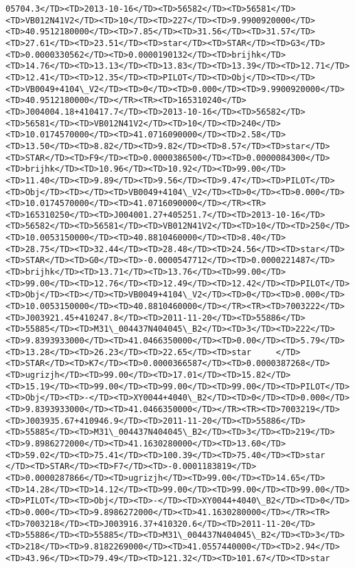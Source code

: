 \documentclass[11pt]{article}
\begin{document}
\begin{Verbatim}[commandchars=\\\{\}]
05704.3</TD><TD>2013-10-16</TD><TD>56582</TD><TD>56581</TD><TD>VB012N41V2</TD><TD>10</TD><TD>227</TD><TD>9.9900920000</TD><TD>40.9512180000</TD><TD>7.85</TD><TD>31.56</TD><TD>31.57</TD><TD>27.61</TD><TD>23.51</TD><TD>star</TD><TD>STAR</TD><TD>G3</TD><TD>0.0000330562</TD><TD>0.0000190132</TD><TD>brijhk</TD><TD>14.76</TD><TD>13.13</TD><TD>13.83</TD><TD>13.39</TD><TD>12.71</TD><TD>12.41</TD><TD>12.35</TD><TD>PILOT</TD><TD>Obj</TD><TD></TD><TD>VB0049+4104\_V2</TD><TD>0</TD><TD>0.000</TD><TD>9.9900920000</TD><TD>40.9512180000</TD></TR><TR><TD>165310240</TD><TD>J004004.18+410417.7</TD><TD>2013-10-16</TD><TD>56582</TD><TD>56581</TD><TD>VB012N41V2</TD><TD>10</TD><TD>240</TD><TD>10.0174570000</TD><TD>41.0716090000</TD><TD>2.58</TD><TD>13.50</TD><TD>8.82</TD><TD>9.82</TD><TD>8.57</TD><TD>star</TD><TD>STAR</TD><TD>F9</TD><TD>0.0000386500</TD><TD>0.0000084300</TD><TD>brijhk</TD><TD>10.96</TD><TD>10.92</TD><TD>99.00</TD><TD>11.40</TD><TD>9.89</TD><TD>9.56</TD><TD>9.47</TD><TD>PILOT</TD><TD>Obj</TD><TD></TD><TD>VB0049+4104\_V2</TD><TD>0</TD><TD>0.000</TD><TD>10.0174570000</TD><TD>41.0716090000</TD></TR><TR><TD>165310250</TD><TD>J004001.27+405251.7</TD><TD>2013-10-16</TD><TD>56582</TD><TD>56581</TD><TD>VB012N41V2</TD><TD>10</TD><TD>250</TD><TD>10.0053150000</TD><TD>40.8810460000</TD><TD>8.40</TD><TD>28.75</TD><TD>32.44</TD><TD>28.48</TD><TD>24.56</TD><TD>star</TD><TD>STAR</TD><TD>G0</TD><TD>-0.0000547712</TD><TD>0.0000221487</TD><TD>brijhk</TD><TD>13.71</TD><TD>13.76</TD><TD>99.00</TD><TD>99.00</TD><TD>12.76</TD><TD>12.49</TD><TD>12.42</TD><TD>PILOT</TD><TD>Obj</TD><TD></TD><TD>VB0049+4104\_V2</TD><TD>0</TD><TD>0.000</TD><TD>10.0053150000</TD><TD>40.8810460000</TD></TR><TR><TD>7003222</TD><TD>J003921.45+410247.8</TD><TD>2011-11-20</TD><TD>55886</TD><TD>55885</TD><TD>M31\_004437N404045\_B2</TD><TD>3</TD><TD>222</TD><TD>9.8393933000</TD><TD>41.0466350000</TD><TD>0.00</TD><TD>5.79</TD><TD>13.28</TD><TD>26.23</TD><TD>22.65</TD><TD>star     </TD><TD>STAR</TD><TD>K7</TD><TD>0.0000366587</TD><TD>0.0000387268</TD><TD>ugrizjh</TD><TD>99.00</TD><TD>17.01</TD><TD>15.82</TD><TD>15.19</TD><TD>99.00</TD><TD>99.00</TD><TD>99.00</TD><TD>PILOT</TD><TD>Obj</TD><TD>-</TD><TD>XY0044+4040\_B2</TD><TD>0</TD><TD>0.000</TD><TD>9.8393933000</TD><TD>41.0466350000</TD></TR><TR><TD>7003219</TD><TD>J003935.67+410946.9</TD><TD>2011-11-20</TD><TD>55886</TD><TD>55885</TD><TD>M31\_004437N404045\_B2</TD><TD>3</TD><TD>219</TD><TD>9.8986272000</TD><TD>41.1630280000</TD><TD>13.60</TD><TD>59.02</TD><TD>75.41</TD><TD>100.39</TD><TD>75.40</TD><TD>star     </TD><TD>STAR</TD><TD>F7</TD><TD>-0.0001183819</TD><TD>0.0000287866</TD><TD>ugrizjh</TD><TD>99.00</TD><TD>14.65</TD><TD>14.28</TD><TD>14.12</TD><TD>99.00</TD><TD>99.00</TD><TD>99.00</TD><TD>PILOT</TD><TD>Obj</TD><TD>-</TD><TD>XY0044+4040\_B2</TD><TD>0</TD><TD>0.000</TD><TD>9.8986272000</TD><TD>41.1630280000</TD></TR><TR><TD>7003218</TD><TD>J003916.37+410320.6</TD><TD>2011-11-20</TD><TD>55886</TD><TD>55885</TD><TD>M31\_004437N404045\_B2</TD><TD>3</TD><TD>218</TD><TD>9.8182269000</TD><TD>41.0557440000</TD><TD>2.94</TD><TD>43.96</TD><TD>79.49</TD><TD>121.32</TD><TD>101.67</TD><TD>star     
\end{Verbatim}
\end{document}
